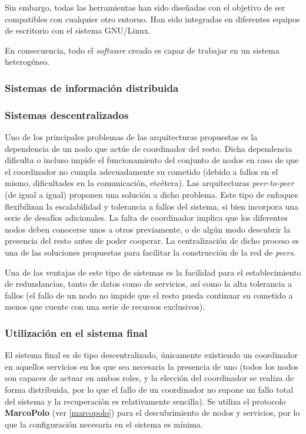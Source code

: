 Sin embargo, todas las herramientas han sido diseñadas con el objetivo de ser compatibles con cualquier otro entorno. Han sido integradas en diferentes equipos de escritorio con el sistema GNU/Linux. %

En consecuencia, todo el \textit{software} creado es capaz de trabajar en un sistema heterogéneo.

\subsubsection{Sistemas de información distribuida}
\citationneeded

\subsubsection{Sistemas descentralizados}

Uno de los principales problemas de las arquitecturas propuestas es la dependencia de un nodo que actúe de coordinador del resto. Dicha dependencia dificulta o incluso impide el funcionamiento del conjunto de nodos en caso de que el coordinador no cumpla adecuadamente su cometido (debido a fallos en el mismo, dificultades en la comunicación, etcétera). Las arquitecturas \textit{peer-to-peer} (de igual a igual) proponen una solución a dicho problema. Este tipo de enfoques flexibilizan la escalabilidad y tolerancia a fallos del sistema, si bien incorpora una serie de desafíos adicionales. La falta de coordinador implica que los diferentes nodos deben conocerse unos a otros previamente, o de algún modo descubrir la presencia del resto antes de poder cooperar. La centralización de dicho proceso es una de las soluciones propuestas para facilitar la construcción de la red de \textit{peers}.

Una de las ventajas de este tipo de sistemas es la facilidad para el establecimiento de redundancias, tanto de datos como de servicios, así como la alta tolerancia a fallos (el fallo de un nodo no impide que el resto pueda continuar su cometido a menos que cuente con una serie de recursos exclusivos).


\subsubsection{Utilización en el sistema final}

El sistema final es de tipo descentralizado, únicamente existiendo un coordinador en aquellos servicios en los que sea necesaria la presencia de uno (todos los nodos son capaces de actuar en ambos roles, y la elección del coordinador se realiza de forma distribuida, por lo que el fallo de un coordinador no supone un fallo total del sistema y la recuperación es relativamente sencilla). Se utiliza el protocolo \textbf{MarcoPolo} (ver \ref{marcopolo}) para el descubrimiento de nodos y servicios, por lo que la configuración necesaria en el sistema es mínima.



